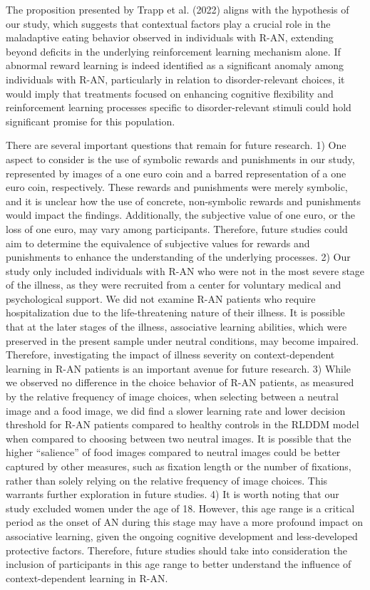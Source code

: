 \documentclass[
  man,floatsintext]{apa6}
\begin{document}
The proposition presented by Trapp et al. (2022) aligns with the hypothesis of our study, which suggests that contextual factors play a crucial role in the maladaptive eating behavior observed in individuals with R-AN, extending beyond deficits in the underlying reinforcement learning mechanism alone. If abnormal reward learning is indeed identified as a significant anomaly among individuals with R-AN, particularly in relation to disorder-relevant choices, it would imply that treatments focused on enhancing cognitive flexibility and reinforcement learning processes specific to disorder-relevant stimuli could hold significant promise for this population.

There are several important questions that remain for future research. 1) One aspect to consider is the use of symbolic rewards and punishments in our study, represented by images of a one euro coin and a barred representation of a one euro coin, respectively. These rewards and punishments were merely symbolic, and it is unclear how the use of concrete, non-symbolic rewards and punishments would impact the findings. Additionally, the subjective value of one euro, or the loss of one euro, may vary among participants. Therefore, future studies could aim to determine the equivalence of subjective values for rewards and punishments to enhance the understanding of the underlying processes. 2) Our study only included individuals with R-AN who were not in the most severe stage of the illness, as they were recruited from a center for voluntary medical and psychological support. We did not examine R-AN patients who require hospitalization due to the life-threatening nature of their illness. It is possible that at the later stages of the illness, associative learning abilities, which were preserved in the present sample under neutral conditions, may become impaired. Therefore, investigating the impact of illness severity on context-dependent learning in R-AN patients is an important avenue for future research. 3) While we observed no difference in the choice behavior of R-AN patients, as measured by the relative frequency of image choices, when selecting between a neutral image and a food image, we did find a slower learning rate and lower decision threshold for R-AN patients compared to healthy controls in the RLDDM model when compared to choosing between two neutral images. It is possible that the higher ``salience'' of food images compared to neutral images could be better captured by other measures, such as fixation length or the number of fixations, rather than solely relying on the relative frequency of image choices. This warrants further exploration in future studies. 4) It is worth noting that our study excluded women under the age of 18. However, this age range is a critical period as the onset of AN during this stage may have a more profound impact on associative learning, given the ongoing cognitive development and less-developed protective factors. Therefore, future studies should take into consideration the inclusion of participants in this age range to better understand the influence of context-dependent learning in R-AN.
\end{document}
